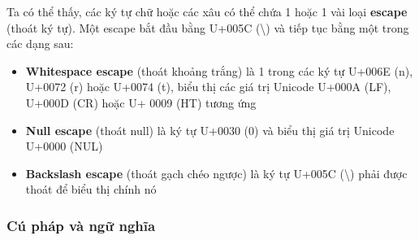     Ta có thể thấy, các ký tự chữ hoặc các xâu có thể chứa 1 hoặc 1 vài loại \textbf{escape} (thoát ký tự). Một escape bắt đầu bằng U+005C (\textbackslash) và tiếp tục bằng một trong các dạng sau:

    \begin{itemize}
    \item{\textbf{Whitespace escape} (thoát khoảng trắng) là 1 trong các ký tự U+006E (n), U+0072 (r) hoặc U+0074 (t), biểu thị các giá trị Unicode U+000A (LF), U+000D (CR) hoặc U+ 0009 (HT) tương ứng}
    \item{\textbf{Null escape} (thoát null) là ký tự U+0030 (0) và biểu thị giá trị Unicode U+0000 (NUL)}
    \item{\textbf{Backslash escape} (thoát gạch chéo ngược) là ký tự U+005C (\textbackslash) phải được thoát để biểu thị chính nó}
    \end{itemize}

\subsubsection{Cú pháp và ngữ nghĩa}
